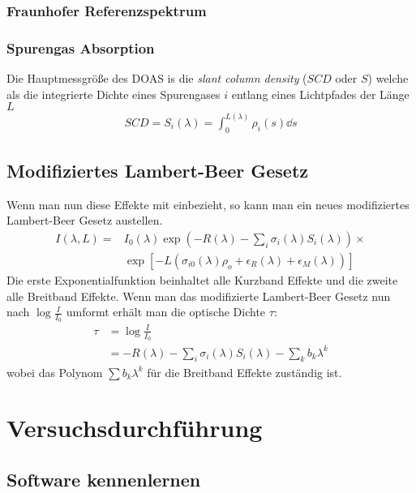 \documentclass[12pt, a4paper, bibliography=totoc]{scrartcl}
\begin{document}
\begin{multicols}{2}
\subsubsection{Fraunhofer Referenzspektrum}

    \subsubsection{Spurengas Absorption}
    Die Hauptmessgröße des DOAS is die \textit{slant column density} ($SCD$ oder $S$)
    welche als die integrierte Dichte eines Spurengases $i$ entlang eines Lichtpfades der Länge $L$
    \begin{align}
        SCD = S_i (\lambda) = \int_0^{L(\lambda)} \rho_i (s) \dd s
    \end{align}

\subsection{Modifiziertes Lambert-Beer Gesetz}

Wenn man nun diese Effekte mit einbezieht, so kann man ein neues modifiziertes Lambert-Beer Gesetz austellen.
\begin{align*}
    I(\lambda, L) = & I_0 (\lambda) \exp \left( -R ( \lambda ) - \sum_i \sigma_i (\lambda)
    S_i (\lambda) \right) \times \\
    & \exp \left[ - L \left( \sigma_{i0} (\lambda) \rho_o + \epsilon_R (\lambda) + \epsilon_M (\lambda) \right) \right]
\end{align*}
Die erste Exponentialfunktion beinhaltet alle Kurzband Effekte und die zweite alle Breitband Effekte.
Wenn man das modifizierte Lambert-Beer Gesetz nun nach $\log \frac{I}{I_0}$ umformt erhält man die optische Dichte $\tau$:
\begin{align}
\tau &= \log \frac{I}{I_0} \\
    &= - R(\lambda) - \sum_i \sigma_i (\lambda) S_i (\lambda) - \sum_k b_k \lambda^k
\end{align}
wobei das Polynom $\sum b_k \lambda^k$ für die Breitband Effekte zuständig ist.


\section{Versuchsdurchführung}



\subsection{Software kennenlernen}


\end{multicols}
\end{document}
